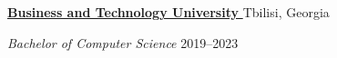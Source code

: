 \href{https://btu.edu.ge/en/home-english/}{
    \textbf{Business and Technology University}
    } \hfill Tbilisi, Georgia 
    
\par
\textit{Bachelor of Computer Science} \hfill 2019--2023
\par
